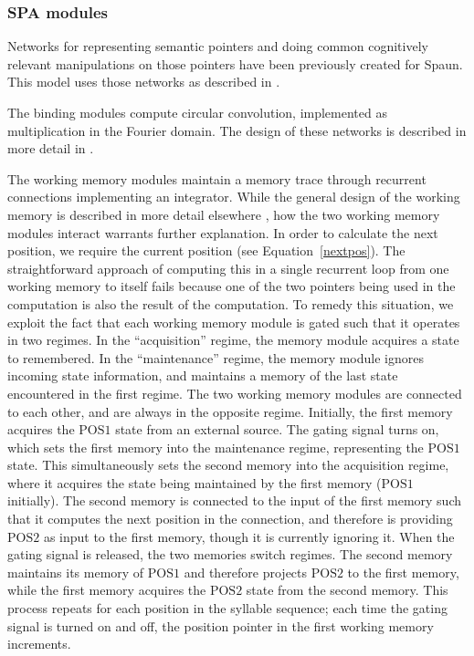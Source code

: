 \subsubsection{SPA modules}

Networks for representing semantic pointers
and doing common cognitively relevant
manipulations on those pointers
have been previously created
for Spaun.
This model uses those networks
as described in \citet{eliasmith2013}.

The binding modules compute
circular convolution,
implemented as multiplication
in the Fourier domain.
The design of these networks
is described in more detail in
\citet{choo2010}.

The working memory modules
maintain a memory trace
through recurrent connections
implementing an integrator.
While the general design of the working memory
is described in more detail elsewhere
\citep{choo2010},
how the two working memory modules
interact warrants further explanation.
In order to calculate the next position,
we require the current position
(see Equation~\eqref{nextpos}).
The straightforward approach
of computing this in a single recurrent loop
from one working memory to itself
fails because one of the two pointers
being used in the computation
is also the result of the computation.
To remedy this situation, we exploit the fact that
each working memory module is gated
such that it operates in two regimes.
In the ``acquisition'' regime,
the memory module acquires a state to remembered.
In the ``maintenance'' regime,
the memory module ignores incoming state information,
and maintains a memory of the last state
encountered in the first regime.
The two working memory modules
are connected to each other,
and are always in the opposite regime.
Initially, the first memory
acquires the $\text{POS1}$ state
from an external source.
The gating signal turns on,
which sets the first memory
into the maintenance regime,
representing the $\text{POS1}$ state.
This simultaneously sets the second memory
into the acquisition regime,
where it acquires the state
being maintained by the first memory
($\text{POS1}$ initially).
The second memory is connected
to the input of the first memory
such that it computes the
next position in the connection,
and therefore is providing
$\text{POS2}$ as input to the first memory,
though it is currently ignoring it.
When the gating signal is released,
the two memories switch regimes.
The second memory maintains
its memory of $\text{POS1}$
and therefore projects $\text{POS2}$
to the first memory,
while the first memory acquires
the $\text{POS2}$ state from the second memory.
This process repeats for each position
in the syllable sequence;
each time the gating signal
is turned on and off,
the position pointer
in the first working memory increments.

